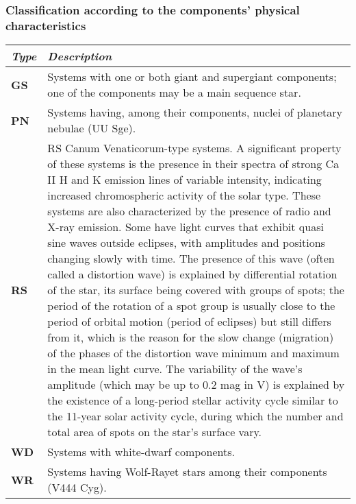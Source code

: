 \subsubsection{Classification according to the components' physical characteristics}
\label{classification-according-to-the-components-physical-characteristics}

\begin{longtabu} to \textwidth {l|X}\toprule
\emph{Type} & \emph{Description}\\\midrule
\textbf{GS} & Systems with one or both giant and supergiant components;
              one of the components may be a main sequence star.\\\midrule
\textbf{PN} & Systems having, among their components, nuclei of planetary nebulae (UU Sge).\\\midrule
\textbf{RS} & RS Canum Venaticorum-type systems. A significant property
              of these systems is the presence in their spectra of strong Ca II H and
              K emission lines of variable intensity, indicating increased
              chromospheric activity of the solar type. These systems are also
              characterized by the presence of radio and X-ray emission. Some have
              light curves that exhibit quasi sine waves outside eclipses, with
              amplitudes and positions changing slowly with time. The presence of this
              wave (often called a distortion wave) is explained by differential
              rotation of the star, its surface being covered with groups of spots;
              the period of the rotation of a spot group is usually close to the
              period of orbital motion (period of eclipses) but still differs from it,
              which is the reason for the slow change (migration) of the phases of the
              distortion wave minimum and maximum in the mean light curve. The
              variability of the wave's amplitude (which may be up to 0.2 mag in V) is
              explained by the existence of a long-period stellar activity cycle
              similar to the 11-year solar activity cycle, during which the number and
              total area of spots on the star's surface vary.\\\midrule
\textbf{WD} & Systems with white-dwarf components.\\\midrule
\textbf{WR} & Systems having Wolf-Rayet stars among their components (V444 Cyg).\\\bottomrule
\end{longtabu}

